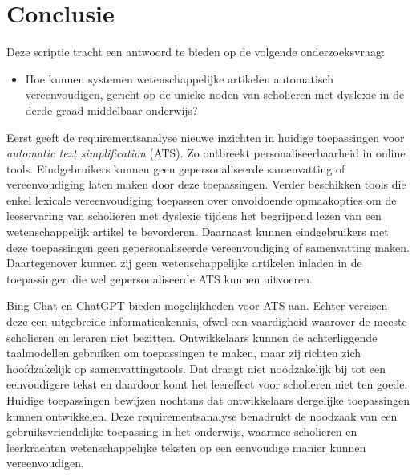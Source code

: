 
\chapter{Conclusie}%
\label{ch:conclusie}

Deze scriptie tracht een antwoord te bieden op de volgende onderzoeksvraag:

\begin{itemize}
	\item Hoe kunnen systemen wetenschappelijke artikelen automatisch vereenvoudigen, gericht op de unieke noden van scholieren met dyslexie in de derde graad middelbaar onderwijs?
\end{itemize}

Eerst geeft de requirementsanalyse nieuwe inzichten in huidige toepassingen voor \textit{automatic text simplification} (ATS). Zo ontbreekt personaliseerbaarheid in online tools. Eindgebruikers kunnen geen gepersonaliseerde samenvatting of vereenvoudiging laten maken door deze toepassingen. Verder beschikken tools die enkel lexicale vereenvoudiging toepassen over onvoldoende opmaakopties om de leeservaring van scholieren met dyslexie tijdens het begrijpend lezen van een wetenschappelijk artikel te bevorderen. Daarnaast kunnen eindgebruikers met deze toepassingen geen gepersonaliseerde vereenvoudiging of samenvatting maken. Daartegenover kunnen zij geen wetenschappelijke artikelen inladen in de toepassingen die wel gepersonaliseerde ATS kunnen uitvoeren. 

\medspace

Bing Chat en ChatGPT bieden mogelijkheden voor ATS aan. Echter vereisen deze een uitgebreide informaticakennis, ofwel een vaardigheid waarover de meeste scholieren en leraren niet bezitten. Ontwikkelaars kunnen de achterliggende taalmodellen gebruiken om toepassingen te maken, maar zij richten zich hoofdzakelijk op samenvattingstools. Dat draagt niet noodzakelijk bij tot een eenvoudigere tekst en daardoor komt het leereffect voor scholieren niet ten goede. Huidige toepassingen bewijzen nochtans dat ontwikkelaars dergelijke toepassingen kunnen ontwikkelen. Deze requirementsanalyse benadrukt de noodzaak van een gebruiksvriendelijke toepassing in het onderwijs, waarmee scholieren en leerkrachten wetenschappelijke teksten op een eenvoudige manier kunnen vereenvoudigen.


